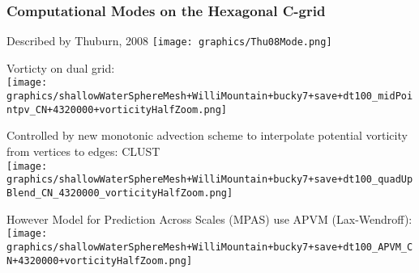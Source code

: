 \makeatletter{}\begin{frame}
\frametitle{Computational Modes on the Hexagonal C-grid}

\begin{minipage}{0.49\linewidth}\centering
Described by Thuburn, 2008
\texttt{[image: graphics/Thu08Mode.png]}
\pause
\end{minipage}
\begin{minipage}{0.49\linewidth}
Vorticty on dual grid:\\
\texttt{[image: graphics/shallowWaterSphereMesh+WilliMountain+bucky7+save+dt100\_midPointpv\_CN+4320000+vorticityHalfZoom.png]}
\pause
\end{minipage}
\begin{minipage}{0.49\linewidth}\raggedright\small
Controlled by new monotonic advection scheme to interpolate potential vorticity from vertices to edges: CLUST\\
\texttt{[image: graphics/shallowWaterSphereMesh+WilliMountain+bucky7+save+dt100\_quadUpBlend\_CN\_4320000\_vorticityHalfZoom.png]}
\pause
\end{minipage}
\begin{minipage}{0.49\linewidth}\centering\small
However Model for Prediction Across Scales (MPAS) use APVM (Lax-Wendroff):\\
\texttt{[image: graphics/shallowWaterSphereMesh+WilliMountain+bucky7+save+dt100\_APVM\_CN+4320000+vorticityHalfZoom.png]}
\end{minipage}

\end{frame}

